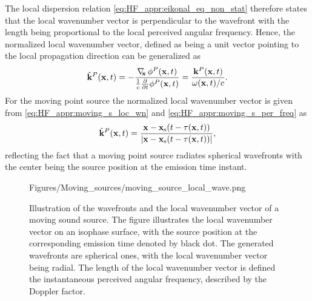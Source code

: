 The local dispersion relation \eqref{eq:HF_appr:eikonal_eq_non_stat} therefore states that the local wavenumber vector is perpendicular to the wavefront with the length being proportional to the local perceived angular frequency.
Hence, the normalized local wavenumber vector, defined as being a unit vector pointing to the local propagation direction can be generalized as
\begin{equation}
\label{eq:Moving_source:local_wn_general}
\hat{\mathbf{k}}^P(\mathbf{x},t) = -\frac{\nabla_{\!\!\mathbf{x}}\, \phi^P(\mathbf{x},t)}{\frac{1}{c}\frac{\partial}{\partial t} \phi^P(\mathbf{x},t)}  = \frac{\mathbf{k}^P(\mathbf{x},t)}{ \omega(\mathbf{x},t)/c }.
\end{equation}
For the moving point source the normalized local wavenumber vector is given from \eqref{eq:HF_appr:moving_s_loc_wn} and \eqref{eq:HF_appr:moving_s_per_freq} as
\begin{equation}
\label{eq:Moving_source:norm_local_wn_moving_source}
\hat{\mathbf{k}}^P(\mathbf{x},t) = \frac{\mathbf{x} -\mathbf{x}_{\mathrm{s}}(t-\tau(\mathbf{x},t))}{|\mathbf{x}-\mathbf{x}_{\mathrm{s}}(t-\tau(\mathbf{x},t))|},
\end{equation}
reflecting the fact that a moving point source radiates spherical wavefronts with the center being the source position at the emission time instant.
\begin{figure} 
	\small
    \begin{minipage}[c]{0.6\textwidth}
    \hspace{0cm}
	\begin{overpic}[width = 1.0\columnwidth ]{Figures/Moving_sources/moving_source_local_wave.png}
	\small
	\end{overpic} 
	\end{minipage}
	\hspace{10mm}
	\begin{minipage}[c]{0.35\textwidth}
    \caption{
	Illustration of the wavefronts and the local wavenumber vector of a moving sound source.
	The figure illustrates the local wavenumber vector on an isophase surface, with the source position at the corresponding emission time denoted by black dot.
	The generated wavefronts are spherical ones, with the local wavenumber vector being radial.
	The length of the local wavenumber vector is defined the instantaneous perceived angular frequency, described by the Doppler factor.}
	\label{Fig:Moving_source:moving_source_local_wn}
	\end{minipage}
\end{figure}  

